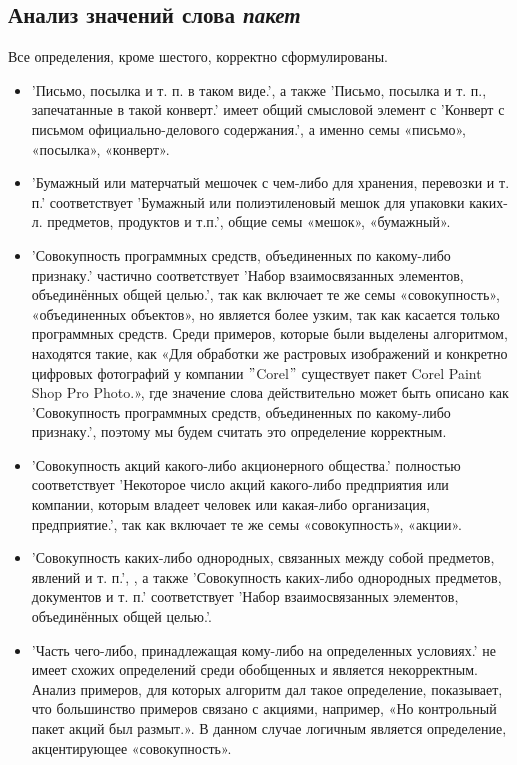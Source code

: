 \subsection*{Анализ значений слова \textit{пакет}}

Все определения, кроме шестого, корректно сформулированы.

\begin{itemize}
    \item ’Письмо, посылка и т. п. в таком виде.’, а также
’Письмо, посылка и т. п., запечатанные в такой конверт.’ имеет общий смысловой элемент с
’Конверт с письмом официально-делового содержания.’, а именно семы «письмо», «посылка», «конверт».

    \item ’Бумажный или матерчатый мешочек с чем-либо для хранения, перевозки и т. п.’ соответствует
’Бумажный или полиэтиленовый мешок для упаковки каких-л. предметов, продуктов и т.п.’,
общие семы «мешок», «бумажный».

    \item ’Совокупность программных средств, объединенных по какому-либо признаку.’ частично соответствует
’Набор взаимосвязанных элементов, объединённых общей целью.’,
так как включает те же семы «совокупность», «объединенных объектов»,
но является более узким, так как касается только программных средств.
Среди примеров, которые были выделены алгоритмом, находятся такие, как
«Для обработки же растровых изображений и конкретно цифровых фотографий у компании \("\)Corel\("\)
существует пакет Corel Paint Shop Pro Photo.», где значение слова действительно может
быть описано как ’Совокупность программных средств, объединенных по какому-либо признаку.’,
поэтому мы будем считать это определение корректным.

    \item ’Совокупность акций какого-либо акционерного общества.’ полностью соответствует
’Некоторое число акций какого-либо предприятия или компании, которым владеет человек или какая-либо организация, предприятие.’,
так как включает те же семы «совокупность», «акции».

    \item ’Совокупность каких-либо однородных, связанных между собой предметов, явлений и т. п.’,
, а также ’Совокупность каких-либо однородных предметов, документов и т. п.’
соответствует ’Набор взаимосвязанных элементов, объединённых общей целью.’.  %
\end{itemize}

\begin{itemize}
    \item ’Часть чего-либо, принадлежащая кому-либо на определенных условиях.’ не
имеет схожих определений среди обобщенных и является некорректным.
Анализ примеров, для которых алгоритм дал такое определение, показывает, что
большинство примеров связано с акциями, например, «Но контрольный пакет акций был размыт.».
В данном случае логичным является определение, акцентирующее «совокупность».
\end{itemize}

